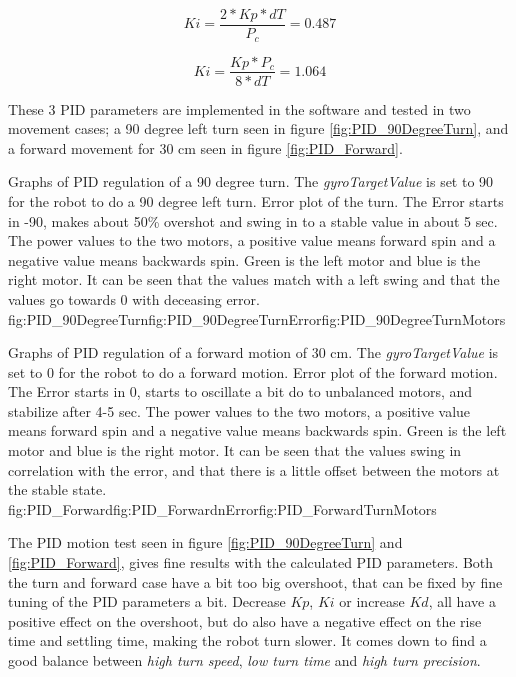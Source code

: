 $$ Ki = \frac{2*Kp*dT}{P_c} = 0.487 $$

$$ Ki = \frac{Kp*P_c}{8*dT} = 1.064 $$

These 3 PID parameters are implemented in the software and tested in two movement cases; a 90 degree left turn seen in figure \ref{fig:PID_90DegreeTurn}, and a forward movement for 30 cm seen in figure \ref{fig:PID_Forward}.


{Graphs of PID regulation of a 90 degree turn. The \emph{gyroTargetValue} is set to 90 for the robot to do a 90 degree left turn.}
{Error plot of the turn. The Error starts in -90, makes about 50\% overshot and swing in to a stable value in about 5 sec.}
{The power values to the two motors, a positive value means forward spin and a negative value means backwards spin. Green is the left motor and blue is the right motor. It can be seen that the values match with a left swing and that the values go towards 0 with deceasing error.}
{fig:PID_90DegreeTurn}{fig:PID_90DegreeTurnError}{fig:PID_90DegreeTurnMotors}

{Graphs of PID regulation of a forward motion of 30 cm. The \emph{gyroTargetValue} is set to 0 for the robot to do a forward motion.}
{Error plot of the forward motion. The Error starts in 0, starts to oscillate a bit do to unbalanced motors, and stabilize after 4-5 sec.}
{The power values to the two motors, a positive value means forward spin and a negative value means backwards spin. Green is the left motor and blue is the right motor. It can be seen that the values swing in correlation with the error, and that there is a little offset between the motors at the stable state.}
{fig:PID_Forward}{fig:PID_ForwardnError}{fig:PID_ForwardTurnMotors}

\FloatBarrier

The PID motion test seen in figure \ref{fig:PID_90DegreeTurn} and \ref{fig:PID_Forward}, gives fine results with the calculated PID parameters.
Both the turn and forward case have a bit too big overshoot, that can be fixed by fine tuning of the PID parameters a bit.
Decrease \emph{$Kp$}, \emph{$Ki$} or increase \emph{$Kd$}, all have a positive effect on the overshoot, but do also have a negative effect on the rise time and settling time, making the robot turn slower.
It comes down to find a good balance between \emph{high turn speed}, \emph{low turn time} and \emph{high turn precision}.

\pagebreak